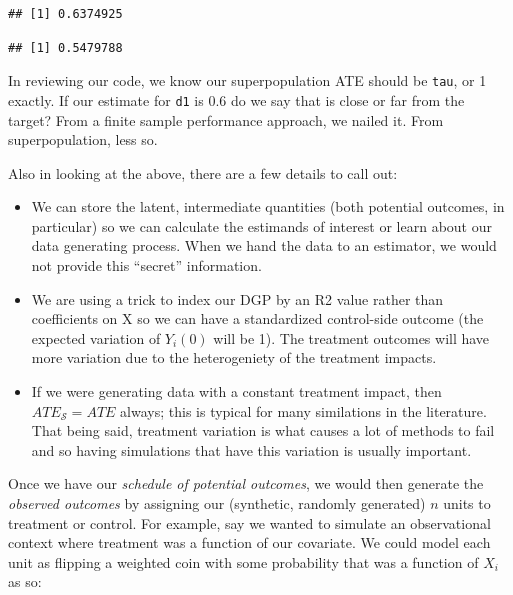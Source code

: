 \documentclass[
]{book}
\newenvironment{Shaded}{\begin{snugshade}}{\end{snugshade}}
\newcommand{\DecValTok}[1]{\textcolor[rgb]{0.00,0.00,0.81}{#1}}
\newcommand{\FunctionTok}[1]{\textcolor[rgb]{0.13,0.29,0.53}{\textbf{#1}}}
\newcommand{\NormalTok}[1]{#1}
\newcommand{\OtherTok}[1]{\textcolor[rgb]{0.56,0.35,0.01}{#1}}
\newcommand{\SpecialCharTok}[1]{\textcolor[rgb]{0.81,0.36,0.00}{\textbf{#1}}}
\providecommand{\tightlist}{%
  \setlength{\itemsep}{0pt}\setlength{\parskip}{0pt}}
\begin{document}
\begin{verbatim}
## [1] 0.6374925
\end{verbatim}

\begin{Shaded}
\end{Shaded}

\begin{verbatim}
## [1] 0.5479788
\end{verbatim}

In reviewing our code, we know our superpopulation ATE should be \texttt{tau}, or 1 exactly.
If our estimate for \texttt{d1} is 0.6 do we say that is close or far from the target?
From a finite sample performance approach, we nailed it.
From superpopulation, less so.

Also in looking at the above, there are a few details to call out:

\begin{itemize}
\tightlist
\item
  We can store the latent, intermediate quantities (both potential outcomes, in particular) so we can calculate the estimands of interest or learn about our data generating process. When we hand the data to an estimator, we would not provide this ``secret'' information.
\item
  We are using a trick to index our DGP by an R2 value rather than coefficients on X so we can have a standardized control-side outcome (the expected variation of \(Y_i(0)\) will be 1). The treatment outcomes will have more variation due to the heterogeniety of the treatment impacts.
\item
  If we were generating data with a constant treatment impact, then \(ATE_{\mathcal{S}} = ATE\) always; this is typical for many similations in the literature. That being said, treatment variation is what causes a lot of methods to fail and so having simulations that have this variation is usually important.
\end{itemize}

Once we have our \emph{schedule of potential outcomes}, we would then generate the \emph{observed outcomes} by assigning our (synthetic, randomly generated) \(n\) units to treatment or control.
For example, say we wanted to simulate an observational context where treatment was a function of our covariate.
We could model each unit as flipping a weighted coin with some probability that was a function of \(X_i\) as so:
\end{document}
